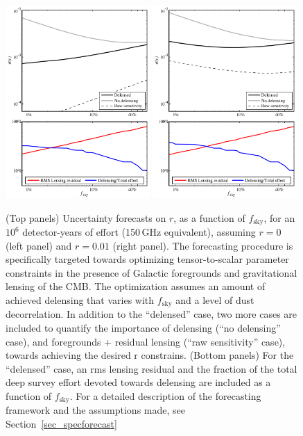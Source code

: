 \begin{figure}[th]
\begin{center}
\includegraphics[width=0.49\textwidth]{Inflation/sigr_fsky_det1e6_r0_v3.pdf}
\includegraphics[width=0.49\textwidth]{Inflation/sigr_fsky_det1e6_r01_v3.pdf}
\end{center}
\caption{(Top panels)
Uncertainty forecasts on $r$, as a function of $f_\mathrm{sky}$, for an
$10^6$ detector-years of effort (150\,GHz equivalent), assuming $r=0$ (left panel) 
and $r=0.01$ (right panel). The forecasting procedure is specifically targeted 
towards optimizing tensor-to-scalar parameter constraints in the presence of 
Galactic foregrounds and gravitational lensing of the CMB. The optimization 
assumes an amount of achieved delensing that varies with $f_\mathrm{sky}$ and a
level of dust decorrelation. In addition to the ``delensed'' case, two more cases are
 included to quantify the importance of delensing (``no delensing'' case), and 
foregrounds + residual lensing (``raw sensitivity'' case), towards achieving the 
desired r constrains.
(Bottom panels)
For the ``delensed'' case, an rms lensing residual and the fraction of the total 
deep survey effort devoted towards delensing are included as a function of 
$f_\mathrm{sky}$. For a detailed description of the forecasting framework and the 
assumptions made, see Section~\ref{sec_specforecast}}
\label{fig_rforecast1}
\end{figure}

